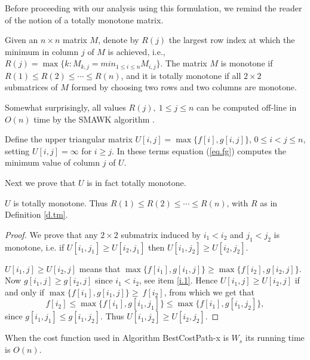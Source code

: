 Before proceeding with our analysis using this formulation, we remind the reader of the notion of 
a totally monotone matrix.
\begin{definition}\label{d.tm}
	Given an $n \times n$ matrix $M$, denote
	by $R(j)$ the largest row index at which the minimum in column $j$ of $M$ is achieved, 
	i.e.,
	$R(j) = \max \{k :M_{k,j} = min_{1\leq i \leq n} M_{i,j}\}$.
	The matrix $M$ is monotone if $R(1) \leq  R(2)\leq \cdots \leq R(n)$, and it is totally monotone 
	if all $2\times 2$
	submatrices of $M$ formed by choosing two rows and two columns are monotone.
\end{definition}
Somewhat surprisingly, all values $R(j),\ 1\leq j \leq n$ 
can be computed off-line in $O(n)$ time by the SMAWK algorithm \cite{smawk1987}.
	
Define the upper triangular matrix $U[i,j]=\max \{ f[i], g[i, j]\}$, $ 0\leq i <j \leq n$,
setting $U[i,j]=\infty$ for $i\geq j$.
In these terms equation (\ref{eq.fg}) computes the minimum value of column $j$ of $U$.

 Next we prove that $U$ is in fact totally monotone.
\begin{proposition}
	$U$ is totally monotone. Thus 
	$R(1) \leq  R(2)\leq \cdots \leq R(n)$, with $R$ as in Definition \ref{d.tm}.

\end{proposition}
\begin{proof}
	We prove that any $2 \times 2$ submatrix induced by $i_1<i_2$ and $j_1<j_2$ is monotone,
	i.e. if $U[i_1,j_1]\geq U[i_2,j_1]$ then $U[i_1,j_2]\geq U[i_2,j_2]$.
		
		 $U[i_1,j]\geq U[i_2,j]$ means that
$\max \{ f[i_1], g[i_1, j]\}\geq \max \{ f[i_2], g[i_2, j]\}$. Now $g[i_1, j]\geq g[i_2, j]$
since $i_1<i_2$, see item \ref{i.1}. Hence $U[i_1,j]\geq U[i_2,j]$ if and only if 
$\max \{ f[i_1], g[i_1, j]\}\geq \ f[i_2]$, from which we get that  
$$ f[i_2]\leq \max \{ f[i_1], g[i_1, j_1]\}\leq \max \{ f[i_1], g[i_1, j_2]\},$$
since $g[i_1, j_1]\leq g[i_1, j_2]$.
Thus $U[i_1,j_2]\geq U[i_2,j_2]$.
\end{proof}



\begin{theorem}
	When the cost function used in Algorithm BestCostPath-x is $W_s$ its running time is $O(n)$.
\end{theorem}

\
